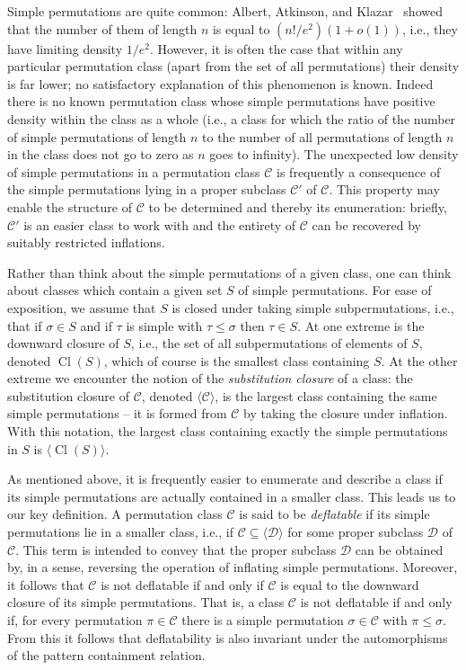 \documentclass[10pt]{article}
\theoremstyle{plain}
\newcommand{\Cl}{\operatorname{Cl}}
\newcommand{\C}{\mathcal{C}}
\newcommand{\D}{\mathcal{D}}
\begin{document}
Simple permutations are quite common: Albert, Atkinson, and Klazar~\cite{albert:enumeration-simple-perms} showed that the number of them of length $n$ is equal to $(n!/e^2)(1 + o(1))$, i.e., they have limiting density $1/e^2$.  However, it is often the case that within any particular permutation class (apart from the set of all permutations) their density is far lower; no satisfactory explanation of this phenomenon is known.  Indeed there is no known permutation class whose simple permutations have positive density within the class as a whole (i.e., a class for which the ratio of the number of simple permutations of length $n$ to the number of all permutations of length $n$ in the class does not go to zero as $n$ goes to infinity). The unexpected low density of simple permutations in a permutation class $\C$ is frequently a consequence of the simple permutations lying in a proper subclass $\C'$ of $\C$. This property may enable the structure of $\C$ to be determined and thereby its enumeration: briefly, $\C'$ is an easier class to work with and the entirety of $\C$ can be recovered by suitably restricted inflations.

Rather than think about the simple permutations of a given class, one can think about classes which contain a given set $S$ of simple permutations. For ease of exposition, we assume that $S$ is closed under taking simple subpermutations, i.e., that if $\sigma \in S$ and if $\tau$ is simple with $\tau \leq \sigma$ then $\tau \in S$. At one extreme is the downward closure of $S$, i.e., the set of all subpermutations of elements of $S$, denoted $\Cl(S)$, which of course is the smallest class containing $S$. At the other extreme we encounter the notion of the \emph{substitution closure} of a class: the substitution closure of $\C$, denoted $\langle \C \rangle$, is the largest class containing the same simple permutations -- it is formed from $\C$ by taking the closure under inflation. With this notation, the largest class containing exactly the simple permutations in $S$ is $\langle \Cl(S) \rangle$.

As mentioned above, it is frequently easier to enumerate and describe a class if its simple permutations are actually contained in a smaller class. This leads us to our key definition. A permutation class $\C$ is said to be \emph{deflatable} if its simple permutations lie in a smaller class, i.e., if $\C \subseteq \langle \D \rangle$ for some proper subclass $\D$ of $\C$. This term is intended to convey that the proper subclass $\D$ can be obtained by, in a sense, reversing the operation of inflating simple permutations. Moreover, it follows that $\C$ is not deflatable if and only if $\C$ is equal to the downward closure of its simple permutations. That is, a class $\C$ is not deflatable if and only if, for every permutation $\pi \in \C$ there is a simple permutation $\sigma \in \C$ with $\pi \leq \sigma$. From this it follows that deflatability is also invariant under the automorphisms of the pattern containment relation.
\end{document}
